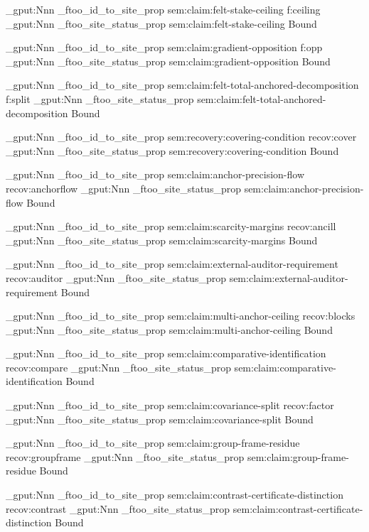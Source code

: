\prop_gput:Nnn \g_ftoo_id_to_site_prop { sem:claim:felt-stake-ceiling } { f:ceiling }
\prop_gput:Nnn \g_ftoo_site_status_prop { sem:claim:felt-stake-ceiling } { Bound }

\prop_gput:Nnn \g_ftoo_id_to_site_prop { sem:claim:gradient-opposition } { f:opp }
\prop_gput:Nnn \g_ftoo_site_status_prop { sem:claim:gradient-opposition } { Bound }

\prop_gput:Nnn \g_ftoo_id_to_site_prop { sem:claim:felt-total-anchored-decomposition } { f:split }
\prop_gput:Nnn \g_ftoo_site_status_prop { sem:claim:felt-total-anchored-decomposition } { Bound }

\prop_gput:Nnn \g_ftoo_id_to_site_prop { sem:recovery:covering-condition } { recov:cover }
\prop_gput:Nnn \g_ftoo_site_status_prop { sem:recovery:covering-condition } { Bound }

\prop_gput:Nnn \g_ftoo_id_to_site_prop { sem:claim:anchor-precision-flow } { recov:anchorflow }
\prop_gput:Nnn \g_ftoo_site_status_prop { sem:claim:anchor-precision-flow } { Bound }

\prop_gput:Nnn \g_ftoo_id_to_site_prop { sem:claim:scarcity-margins } { recov:ancill }
\prop_gput:Nnn \g_ftoo_site_status_prop { sem:claim:scarcity-margins } { Bound }

\prop_gput:Nnn \g_ftoo_id_to_site_prop { sem:claim:external-auditor-requirement } { recov:auditor }
\prop_gput:Nnn \g_ftoo_site_status_prop { sem:claim:external-auditor-requirement } { Bound }

\prop_gput:Nnn \g_ftoo_id_to_site_prop { sem:claim:multi-anchor-ceiling } { recov:blocks }
\prop_gput:Nnn \g_ftoo_site_status_prop { sem:claim:multi-anchor-ceiling } { Bound }

\prop_gput:Nnn \g_ftoo_id_to_site_prop { sem:claim:comparative-identification } { recov:compare }
\prop_gput:Nnn \g_ftoo_site_status_prop { sem:claim:comparative-identification } { Bound }

\prop_gput:Nnn \g_ftoo_id_to_site_prop { sem:claim:covariance-split } { recov:factor }
\prop_gput:Nnn \g_ftoo_site_status_prop { sem:claim:covariance-split } { Bound }

\prop_gput:Nnn \g_ftoo_id_to_site_prop { sem:claim:group-frame-residue } { recov:groupframe }
\prop_gput:Nnn \g_ftoo_site_status_prop { sem:claim:group-frame-residue } { Bound }

\prop_gput:Nnn \g_ftoo_id_to_site_prop { sem:claim:contrast-certificate-distinction } { recov:contrast }
\prop_gput:Nnn \g_ftoo_site_status_prop { sem:claim:contrast-certificate-distinction } { Bound }

